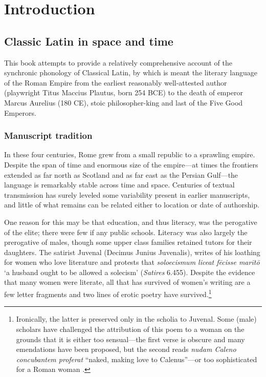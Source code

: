 \chapter{Introduction}

\section{Classic Latin in space and time}

This book attempts to provide a relatively comprehensive account of the synchronic phonology of Classical Latin, by which is meant the literary language of the Roman Empire from the earliest reasonably well-attested author (playwright Titus Maccius Plautus, born 254 BCE) to the death of emperor Marcus Aurelius (180 CE), stoic philosopher-king and last of the Five Good Emperors.

\subsection{Manuscript tradition}

In these four centuries, Rome grew from a small republic to a sprawling empire.
Despite the span of time and enormous size of the empire---at times the frontiers extended as far north as Scotland and as far east as the Persian Gulf---the language is remarkably stable across time and space.
Centuries of textual transmission has surely leveled some variability present in earlier manuscripts, and little of what remains can be related either to location or date of authorship.

One reason for this may be that education, and thus literacy, was the perogative of the elite; there were few if any public schools.
Literacy was also largely the prerogative of males, though some upper class families retained tutors for their daughters.
The satirist Juvenal (Decimus Junius Juvenalis), writes of his loathing for women who love literature and protests that \emph{soloecismum liceat fēcisse marītō} `a husband ought to be allowed a solecism' (\emph{Satires} 6.455).
Despite the evidence that many women were literate, all that has survived of women's writing are a few letter fragments and two lines of erotic poetry have survived.\footnote{
    Ironically, the latter is preserved only in the scholia to Juvenal.
    Some (male) scholars have challenged the attribution of this poem to a woman on the grounds that it is either too sensual---the first verse is obscure and many emendations have been proposed, but the second reads \emph{nudam Caleno concubantem proferat} ``naked, making love to Calenus''---or too sophisticated for a Roman woman \citep[see][]{Keith2006}.}

